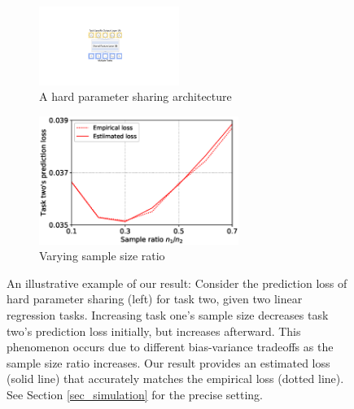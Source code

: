 \begin{figure}[!t]
	\begin{subfigure}[t]{0.5\textwidth}
		\centering
		\includegraphics[width=0.5\textwidth,valign=t]{figures/mtl_model_arch.pdf}
		\caption{A hard parameter sharing architecture}
	\end{subfigure}\hfill
	\begin{subfigure}[t]{0.5\textwidth}
		\centering
		\includegraphics[width=0.713\textwidth,valign=t]{figures/sample_ratio_c2_400.eps}
		\caption{Varying sample size ratio}
		\label{fig_intro_sample_size_b}
	\end{subfigure}
	\caption{An illustrative example of our result:
	Consider the prediction loss of hard parameter sharing (left) for task two, given two linear regression tasks.
	Increasing task one's sample size decreases task two's prediction loss initially, but increases afterward. This phenomenon occurs due to different bias-variance tradeoffs as the sample size ratio increases. Our result provides an estimated loss (solid line) that accurately matches the empirical loss (dotted line).
	See Section \ref{sec_simulation} for the precise setting.}
	\label{fig_intro_sample_size}
\end{figure}

